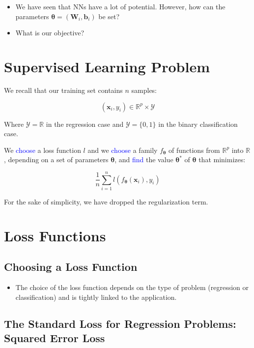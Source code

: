 \documentclass{book}
\newcommand{\x}{\mathbf{x}}
\newcommand{\W}{\mathbf{W}} %
\newcommand{\bias}{\mathbf{b}}%
\newcommand{\param}{\boldsymbol{\theta}}
\newcommand{\R}{\mathbb{R}}
\begin{document}
\begin{itemize}
\item We have seen that NNs have a lot of potential. However, how can the parameters $\param = (\W_i, \bias_i)$ be set?
\item What is our objective?
\end{itemize}

\section{Supervised Learning Problem}

We recall that our training set contains $n$ samples:

\[
(\x_i, y_i) \in \R^p \times \mathcal{Y}
\]

Where $\mathcal{Y}=\R$ in the regression case and $\mathcal{Y}=\{0, 1\}$ in the binary classification case.

We \textcolor{blue}{choose} a loss function $l$ and we \textcolor{blue}{choose} a family $f_{\param}$ of functions from $\R^p$ into $\R$, depending on a set of parameters $\param$, and \textcolor{blue}{find} the value $\param^{\ast}$ of $\param$ that minimizes:

\[
\frac{1}{n} \sum\limits_{i=1}^{n} l (f_{\param}(\x_i), y_i)
\]

\vspace{1em}

\small{For the sake of simplicity, we have dropped the regularization term.}

\section{Loss Functions}

\subsection{Choosing a Loss Function}

\begin{itemize}
\item The choice of the loss function depends on the type of problem (regression or classification) and is tightly linked to the application.
\end{itemize}

\subsection{The Standard Loss for Regression Problems: Squared Error Loss}
\end{document}

